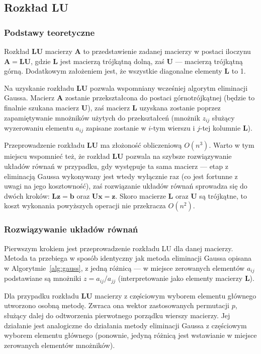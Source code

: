 \documentclass{classrep}
\newcommand{\mA}{\bm{A}}
\newcommand{\mL}{\bm{L}}
\newcommand{\mU}{\bm{U}}
\newcommand{\vb}{\bm{b}}
\newcommand{\vx}{\bm{x}}
\newcommand{\vz}{\bm{z}}
\begin{document}
	\subsection{Rozkład LU}
		\subsubsection{Podstawy teoretyczne}
		Rozkład $\mL \mU$ macierzy $\mA$ to przedstawienie zadanej macierzy w postaci iloczynu $\mA = \mL \mU$, gdzie $\mL$ jest macierzą trójkątną dolną, zaś $\mU$ --- macierzą trójkątną górną. Dodatkowym założeniem jest, że wszystkie diagonalne elementy $\mL$ to 1. 
		
		Na uzyskanie rozkładu $\mL \mU$ pozwala wspomniany wcześniej algorytm eliminacji Gaussa. Macierz $\mA$ zostanie przekształcona do postaci górnotrójkątnej (będzie to finalnie szukana macierz $\mU$), zaś macierz $\mL$ uzyskana zostanie poprzez zapamiętywanie mnożników użytych do przekształceń (mnożnik $z_{ij}$ służący wyzerowaniu elementu $a_{ij}$ zapisane zostanie w $i$-tym wierszu i $j$-tej kolumnie $\mL$).
		
		Przeprowadzenie rozkładu $\mL \mU$ ma złożoność obliczeniową $O(n^3)$. Warto w tym miejscu wspomnieć też, że rozkład $\mL \mU$ pozwala na szybsze rozwiązywanie układów równań w przypadku, gdy występuje ta sama macierz --- etap z eliminacją Gaussa wykonywany jest wtedy wyłącznie raz (co jest fortunne z uwagi na jego kosztowność), zaś rozwiązanie układów równań sprowadza się do dwóch kroków: $\mL \vz = \vb$ oraz $\mU \vx = \vz$.
		Skoro macierze $\mL$ oraz $\mU$ są trójkątne, to koszt wykonania powyższych operacji nie przekracza $O(n^2)$. 
	
		\subsubsection{Rozwiązywanie układów równań}
		Pierwszym krokiem jest przeprowadzenie rozkładu LU dla danej macierzy. Metoda ta przebiega w sposób identyczny jak metoda eliminacji Gaussa opisana w Algorytmie~\ref{alg:gauss}, z jedną różnicą --- w miejsce zerowanych elementów $a_{ij}$ podstawiane są mnożniki $z = {a_{ij}}/ {a_{jj}}$ (interpretowanie jako elementy macierzy $\mL$). 

Dla przypadku rozkładu $\bm{LU}$ macierzy z częściowym wyborem elementu głównego utworzono osobną metodę. Zwraca ona wektor zastosowanych permutacji $p$, służący dalej do odtworzenia pierwotnego porządku wierszy macierzy. Jej działanie jest analogiczne do działania metody eliminacji Gaussa z częściowym wyborem elementu głównego (ponownie, jedyną różnicą jest wstawianie w miejsce zerowanych elementów mnożników). 
\end{document}
